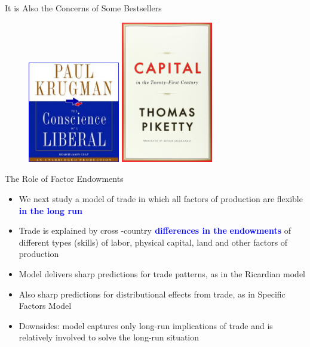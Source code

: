 \documentclass[10pt,hyperref={CJKbookmarks=true},xcolor=dvipsnames,aspectratio=169]{beamer}
\begin{document}
\begin{frame}{It is Also the Concerns of Some Bestsellers }


\begin{figure}


\centering{}\includegraphics[width=4cm]{fig/ho/lec5-2}%
\begin{minipage}[t]{1\columnwidth}%
%
\end{minipage}\includegraphics[width=4cm]{fig/ho/lec5-3}
\end{figure}

\end{frame}

\begin{frame}{The Role of Factor Endowments }

\begin{itemize}
\item We next study a model of trade in which all factors of production
are flexible\textbf{\textcolor{blue}{{} in the long run}} 
\item Trade is explained by cross -country\textbf{\textcolor{blue}{{} differences
in the}} \textbf{\textcolor{blue}{endowments}} of different types
(skills) of labor, physical capital, land and other factors of production 
\item Model delivers sharp predictions for trade patterns, as in the Ricardian
model 
\item Also sharp predictions for distributional effects from trade, as in
Specific Factors Model 
\item Downsides: model captures only long-run implications of trade and
is relatively involved to solve the long-run situation
\end{itemize}
\end{frame}
\end{document}
